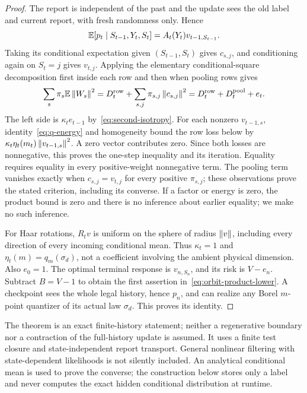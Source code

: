 \begin{proof}
The report is independent of the past and the update sees the old label and current report, with fresh randomness only. Hence
\[
 \mathbb E[p_t\mid S_{t-1},Y_t,S_t]=A_t(Y_t)v_{t-1,S_{t-1}}.
\]
Taking its conditional expectation given $(S_{t-1},S_t)$ gives $c_{s,j}$, and conditioning again on $S_t=j$ gives $v_{t,j}$. Applying the elementary conditional-square decomposition first inside each row and then when pooling rows gives
\[
 \sum_s\pi_s\mathbb E\left\lVert W_s\right\rVert^2
 =D_t^{\rm row}+\sum_{s,j}\pi_{s,j}\left\lVert c_{s,j}\right\rVert^2
 =D_t^{\rm row}+D_t^{\rm pool}+e_t.
\]
The left side is $\kappa_t e_{t-1}$ by~\eqref{eq:second-isotropy}. For each nonzero $v_{t-1,s}$, identity~\eqref{eq:q-energy} and homogeneity bound the row loss below by
$\kappa_t\eta_t(m_t)\left\lVert v_{t-1,s}\right\rVert^2$.
A zero vector contributes zero. Since both losses are nonnegative, this proves the one-step inequality and its iteration. Equality requires equality in every positive-weight nonnegative term. The pooling term vanishes exactly when $c_{s,j}=v_{t,j}$ for every positive $\pi_{s,j}$; these observations prove the stated criterion, including its converse. If a factor or energy is zero, the product bound is zero and there is no inference about earlier equality; we make no such inference.

For Haar rotations, $R_tv$ is uniform on the sphere of radius $\left\lVert v\right\rVert$, including every direction of every incoming conditional mean. Thus $\kappa_t=1$ and $\eta_t(m)=q_m(\sigma_d)$, not a coefficient involving the ambient physical dimension. Also $e_0=1$. The optimal terminal response is $v_{n,S_n}$, and its risk is $V-e_n$. Subtract $B=V-1$ to obtain the first assertion in~\eqref{eq:orbit-product-lower}. A checkpoint sees the whole legal history, hence $p_n$, and can realize any Borel $m$-point quantizer of its actual law $\sigma_d$. This proves its identity.
\end{proof}
The theorem is an exact finite-history statement; neither a regenerative boundary nor a contraction of the full-history update is assumed. It uses a finite test closure and state-independent report transport. General nonlinear filtering with state-dependent likelihoods is not silently included. An analytical conditional mean is used to prove the converse; the construction below stores only a label and never computes the exact hidden conditional distribution at runtime.
